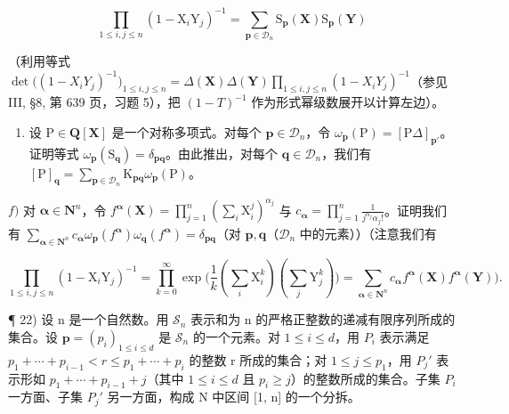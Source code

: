 \[
\prod_ {1 \leqslant i, j \leqslant n} (1 - \mathrm{X} _ {i} \mathrm{Y} _ {j}) ^ {- 1} = \sum_ {\mathbf {p} \in \mathcal {D} _ {n}} \mathrm{S} _ {\mathbf {p}} (\mathbf {X})   \mathrm{S} _ {\mathbf {p}} (\mathbf {Y})
\]

（利用等式 \(\det\big((1 - X_iY_j)^{-1}\big)_{1\leqslant i,j\leqslant n} = \Delta(\mathbf{X})\Delta(\mathbf{Y})\prod_{1\leqslant i,j\leqslant n}(1 - X_iY_j)^{-1}\)（参见 III, §8, 第 639 页，习题 5），把 \((1 - T)^{-1}\) 作为形式幂级数展开以计算左边）。

\begin{enumerate}
\def\labelenumi{\alph{enumi})}
\setcounter{enumi}{4}
\tightlist
\item
  设 \(\mathrm{P} \in \mathbf{Q}[\mathbf{X}]\) 是一个对称多项式。对每个 \(\mathbf{p} \in \mathcal{D}_n\)，令 \(\omega_{\mathbf{p}}(\mathrm{P}) = [\mathrm{P}\Delta]_{\mathbf{p}'}\)。证明等式 \(\omega_{\mathbf{p}}(\mathrm{S}_{\mathbf{q}}) = \delta_{\mathbf{pq}}\)。由此推出，对每个 \(\mathbf{q} \in \mathcal{D}_n\)，我们有 \([\mathrm{P}]_{\mathbf{q}} = \sum_{\mathbf{p} \in \mathcal{D}_n} \mathrm{K}_{\mathbf{pq}} \omega_{\mathbf{p}}(\mathrm{P})\)。
\end{enumerate}

\(f)\) 对 \(\boldsymbol{\alpha}\in\mathbf{N}^{n}\)，令 \(f^{\boldsymbol{\alpha}}(\mathbf{X})=\prod_{j=1}^{n}(\sum_{i}\mathrm{X}_{i}^{j})^{\alpha_{j}}\) 与 \(c_{\boldsymbol{\alpha}}=\prod_{j=1}^{n}\frac{1}{j^{\alpha_{j}}\alpha_{j}!}\)。证明我们有 \(\sum_{\boldsymbol{\alpha}\in\mathbf{N}^{n}}c_{\boldsymbol{\alpha}}\omega_{\mathbf{p}}(f^{\boldsymbol{\alpha}})\omega_{\mathbf{q}}(f^{\boldsymbol{\alpha}})=\delta_{\mathbf{pq}}\)（对 \(\mathbf{p},\mathbf{q}\)（\(\mathcal{D}_{n}\) 中的元素））（注意我们有

\[
\prod_ {1 \leqslant i, j \leqslant n} (1 - \mathrm{X} _ {i} \mathrm{Y} _ {j}) ^ {- 1} = \prod_ {k = 0} ^ {\infty} \exp \bigl (\frac {1}{k} (\sum_ {i} \mathrm{X} _ {i} ^ {k}) (\sum_ {j} \mathrm{Y} _ {j} ^ {k}) \bigr) = \sum_ {\boldsymbol {\alpha} \in \mathbf {N} ^ {n}} c _ {\boldsymbol {\alpha}} f ^ {\boldsymbol {\alpha}} (\mathbf {X}) f ^ {\boldsymbol {\alpha}} (\mathbf {Y}) \bigr).
\]

¶ 22) 设 n 是一个自然数。用 \(\mathcal{S}_{n}\) 表示和为 n 的严格正整数的递减有限序列所成的集合。设 \(\mathbf{p} = (p_{i})_{1 \leqslant i \leqslant d}\) 是 \(\mathcal{S}_{n}\) 的一个元素。对 \(1 \leqslant i \leqslant d\)，用 \(P_{i}\) 表示满足 \(p_{1} + \cdots + p_{i-1} < r \leqslant p_{1} + \cdots + p_{i}\) 的整数 r 所成的集合；对 \(1 \leqslant j \leqslant p_{1}\)，用 \(P_{j}'\) 表示形如 \(p_{1} + \cdots + p_{i-1} + j\)（其中 \(1 \leqslant i \leqslant d\) 且 \(p_{i} \geqslant j\)）的整数所成的集合。子集 \(P_{i}\) 一方面、子集 \(P_{j}'\) 另一方面，构成 N 中区间 {[}1, n{]} 的一个分拆。

